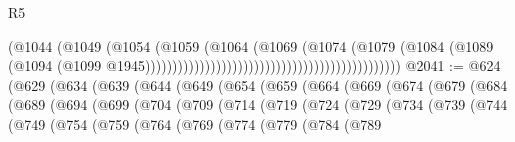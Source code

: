 \begin{lexlean}{R5}
\begin{coremodule}
                                                                          (@1044
                                                                            (@1049
                                                                              (@1054
                                                                                (@1059
                                                                                  (@1064
                                                                                    (@1069
                                                                                      (@1074
                                                                                        (@1079
                                                                                          (@1084
                                                                                            (@1089
                                                                                              (@1094
                                                                                                (@1099
                                                                                                  @1945)))))))))))))))))))))))))))))))))))))))))))))))
@2041 := @624
    (@629
      (@634
        (@639
          (@644
            (@649
              (@654
                (@659
                  (@664
                    (@669
                      (@674
                        (@679
                          (@684
                            (@689
                              (@694
                                (@699
                                  (@704
                                    (@709
                                      (@714
                                        (@719
                                          (@724
                                            (@729
                                              (@734
                                                (@739
                                                  (@744
                                                    (@749
                                                      (@754
                                                        (@759
                                                          (@764
                                                            (@769
                                                              (@774
                                                                (@779
                                                                  (@784
                                                                    (@789

\end{coremodule}
\end{lexlean}
